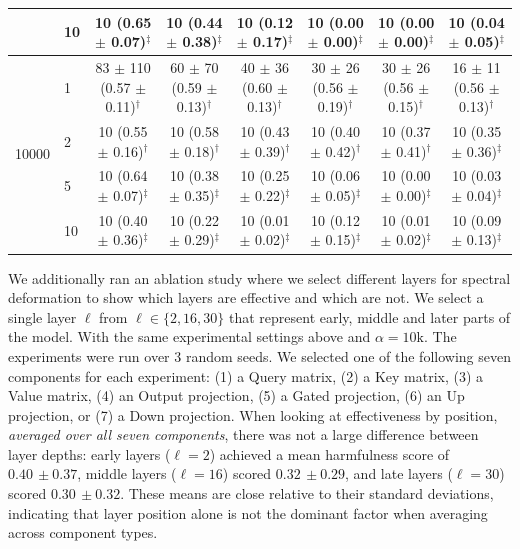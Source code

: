 \documentclass{article}
\theoremstyle{plain}
\theoremstyle{definition}
\theoremstyle{remark}
\begin{document}
\begin{table}[htbp]
\begin{sc}
{\begin{tabular}{llcccccc}
 & 10 & 10 (0.65 $\pm$ 0.07)$^{\ddagger}$ & 10 (0.44 $\pm$ 0.38)$^{\ddagger}$ & 10 (0.12 $\pm$ 0.17)$^{\ddagger}$ & 10 (0.00 $\pm$ 0.00)$^{\ddagger}$ & 10 (0.00 $\pm$ 0.00)$^{\ddagger}$ & 10 (0.04 $\pm$ 0.05)$^{\ddagger}$ \\
\midrule
\multirow{4}{*}{10000} & 1 & 83 $\pm$ 110 (0.57 $\pm$ 0.11)$^{\dagger}$ & 60 $\pm$ 70 (0.59 $\pm$ 0.13)$^{\dagger}$ & 40 $\pm$ 36 (0.60 $\pm$ 0.13)$^{\dagger}$ & 30 $\pm$ 26 (0.56 $\pm$ 0.19)$^{\dagger}$ & 30 $\pm$ 26 (0.56 $\pm$ 0.15)$^{\dagger}$ & 16 $\pm$ 11 (0.56 $\pm$ 0.13)$^{\dagger}$ \\
 & 2 & 10 (0.55 $\pm$ 0.16)$^{\dagger}$ & 10 (0.58 $\pm$ 0.18)$^{\dagger}$ & 10 (0.43 $\pm$ 0.39)$^{\dagger}$ & 10 (0.40 $\pm$ 0.42)$^{\dagger}$ & 10 (0.37 $\pm$ 0.41)$^{\dagger}$ & 10 (0.35 $\pm$ 0.36)$^{\ddagger}$ \\
 & 5 & 10 (0.64 $\pm$ 0.07)$^{\ddagger}$ & 10 (0.38 $\pm$ 0.35)$^{\ddagger}$ & 10 (0.25 $\pm$ 0.22)$^{\ddagger}$ & 10 (0.06 $\pm$ 0.05)$^{\ddagger}$ & 10 (0.00 $\pm$ 0.00)$^{\ddagger}$ & 10 (0.03 $\pm$ 0.04)$^{\ddagger}$ \\
 & 10 & 10 (0.40 $\pm$ 0.36)$^{\ddagger}$ & 10 (0.22 $\pm$ 0.29)$^{\ddagger}$ & 10 (0.01 $\pm$ 0.02)$^{\ddagger}$ & 10 (0.12 $\pm$ 0.15)$^{\ddagger}$ & 10 (0.01 $\pm$ 0.02)$^{\ddagger}$ & 10 (0.09 $\pm$ 0.13)$^{\ddagger}$ \\
\bottomrule
\end{tabular}
}
\end{sc}
\end{table}

We additionally ran an ablation study where we select different layers for spectral deformation to show which layers are effective and which are not. We select a single layer $\ell$ from $\ell \in \{2, 16, 30\}$ that represent early, middle and later parts of the model. With the same experimental settings above and $\alpha=10\mathrm{k}$. The experiments were run over 3 random seeds. We selected one of the following seven components for each experiment: (1) a Query matrix, (2) a Key matrix, (3) a Value matrix, (4) an Output projection, (5) a Gated projection, (6) an Up projection, or (7) a Down projection. When looking at effectiveness by position, \emph{averaged over all seven components}, there was not a large difference between layer depths: early layers ($\ell = 2$) achieved a mean harmfulness score of $0.40 {\,\pm 0.37}$, middle layers ($\ell = 16$) scored $0.32 {\,\pm 0.29}$, and late layers ($\ell = 30$) scored $0.30 {\, \pm 0.32}$. These means are close relative to their standard deviations, indicating that layer position alone is not the dominant factor when averaging across component types.
\end{document}
